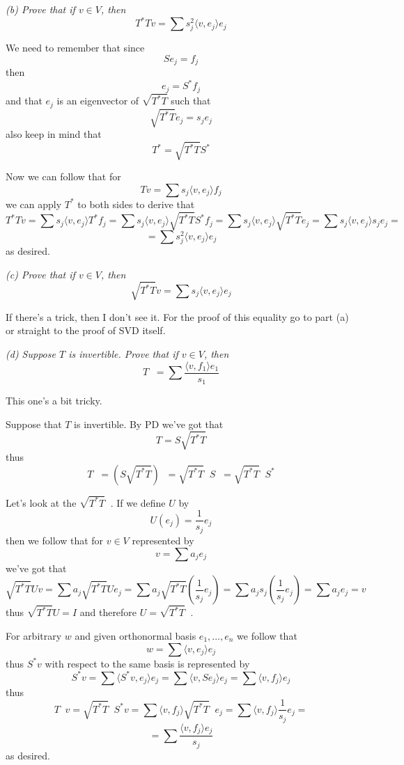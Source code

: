 \documentclass[11pt,oneside,titlepage]{book}
\DeclareMathOperator \inv {^{-1}}
\newcommand{\eangle}[1]{\langle #1 \rangle}
\begin{document}
\textit{(b) Prove that if $v \in V$, then
  $$T^* T v = \sum{ s_j^2 \eangle{v, e_j} e_j}$$
}

We need to remember that since
$$Se_j = f_j$$
then
$$e_j = S^*f_j$$
and that $e_j$ is an eigenvector of $\sqrt{T^* T}$ such that
$$\sqrt{T^* T} e_j = s_j e_j$$
also keep in mind that
$$T^* = \sqrt{T^* T} S^*$$

Now we can follow that for
$$Tv = \sum{ s_j \eangle{v, e_j} f_j}$$
we can apply $T^*$ to both sides to derive that 
$$T^* Tv = \sum{ s_j \eangle{v, e_j} T^* f_j} = \sum{ s_j \eangle{v, e_j} \sqrt{T^* T} S^* f_j} =
\sum{ s_j \eangle{v, e_j} \sqrt{T^* T} e_j} = \sum{ s_j \eangle{v, e_j} s_j e_j} =$$
$$ = 
\sum{ s_j^2 \eangle{v, e_j}  e_j}$$
as desired.

\textit{(c) Prove that if $v \in V$, then
  $$ \sqrt{T^* T} v = \sum{s_j \eangle{v, e_j} e_j}$$  
}

If there's a trick, then I don't see it. For the proof of this equality go to part (a) or
straight to the proof of SVD itself.

\textit{(d) Suppose $T$ is invertible. Prove that if $v \in V$, then
  $$T\inv = \sum{\frac{\eangle{v, f_1} e_1}{s_1}}$$
}

This one's a bit tricky.

Suppose that $T$ is invertible. By PD we've got that
$$T = S \sqrt{T^* T}$$
thus
$$T\inv = (S \sqrt{T^* T})\inv = \sqrt{T^* T}\inv S \inv = \sqrt{T^* T}\inv S^*$$

Let's look at the $\sqrt{T^* T}\inv$. If we define $U$ by
$$U(e_j) = \frac{1}{s_j} e_j$$
then we follow that for $v \in V$ represented by
$$v = \sum{a_j e_j}$$
we've got that
$$\sqrt{T^* T} U v = \sum{a_j \sqrt{T^* T} U e_j} = \sum{a_j \sqrt{T^* T} (\frac{1}{s_j}e_j)} =
\sum{a_j  s_j(\frac{1}{s_j}e_j)} = \sum{a_j e_j} = v$$
thus $\sqrt{T^* T} U = I$ and therefore $U = \sqrt{T^* T}\inv$.

For arbitrary $w$ and given orthonormal basis $e_1, ..., e_n$ we follow that
$$w = \sum{\eangle{v, e_j}e_j}$$
thus $S^* v$ with respect to the same basis is represented by
$$S^*v = \sum{\eangle{S^*v, e_j}e_j} = \sum{\eangle{v, S e_j}e_j} = \sum{\eangle{v, f_j}e_j}$$
thus
$$T\inv v =  \sqrt{T^* T}\inv S^* v = \sum{\eangle{v, f_j} \sqrt{T^* T}\inv e_j} =
\sum{\eangle{v, f_j} \frac{1}{s_j} e_j} = $$
$$ =
\sum{ \frac{\eangle{v, f_j} e_j}{s_j} }
$$
as desired.

\subsection{}
\end{document}
